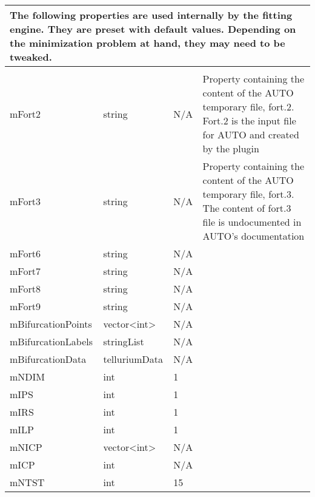\begin{landscape}
\begin{longtable}{p{4cm} l p{3cm}  p{10cm}}
\\[2pt]                                                               
\multicolumn{4}{p{19cm}}{The following properties are used internally by the fitting engine. They are preset with default values. Depending on the minimization problem at hand, they may need to be tweaked. } \\[12pt]
\hline %
\\[2pt]                                                               
mFort2                              &   string              & N/A      &   Property containing the content of the AUTO temporary file, fort.2. Fort.2 is the input file for AUTO and created by the plugin \\
mFort3                              &   string              & N/A      &   Property containing the content of the AUTO temporary file, fort.3. The content of fort.3 file is undocumented in AUTO's documentation \\
mFort6                              &   string              & N/A      &   \\
mFort7                              &   string              & N/A      &   \\
mFort8                              &   string              & N/A      &   \\
mFort9                              &   string              & N/A      &   \\
mBifurcationPoints                  &   vector<int>         & N/A      &   \\
mBifurcationLabels                  &   stringList          & N/A      &   \\
mBifurcationData                    &   telluriumData       & N/A      &   \\
mNDIM                               &   int                 & 1        &   \\
mIPS                                &   int                 & 1        &   \\
mIRS                                &   int                 & 1        &   \\
mILP                                &   int                 & 1        &   \\
mNICP                               &   vector<int>         & N/A      &   \\
mICP                                &   int                 & N/A      &   \\
mNTST                               &   int                 & 15       &   \\

\end{longtable}
\end{landscape}
